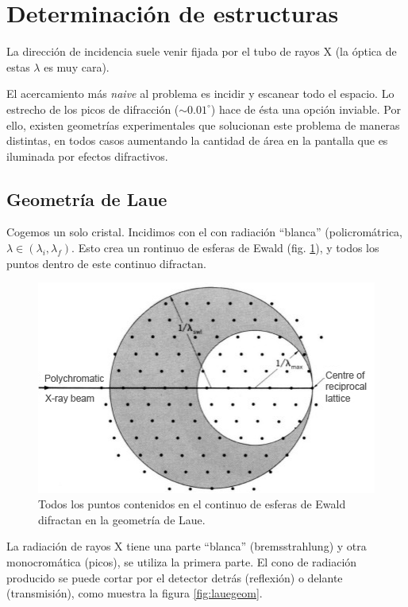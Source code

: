 \section{Determinación de estructuras}
La dirección de incidencia suele venir fijada por el tubo de rayos X (la óptica
de estas $\lambda$ es muy cara).

El acercamiento más \emph{naive} al problema es incidir y escanear todo el
espacio. Lo estrecho de los picos de difracción ($\sim 0.01^ \circ$) hace de ésta una opción inviable. Por ello, existen geometrías
experimentales que solucionan este problema de maneras distintas, en todos casos
aumentando la cantidad de área en la pantalla que es iluminada por efectos difractivos.

\subsection{Geometría de Laue}
Cogemos un solo cristal. Incidimos con el con radiación ``blanca''
(policromátrica, $\lambda \in (\lambda_i,\lambda_f)$. Esto crea un rontinuo de
esferas de Ewald (fig. \ref{fig:ewaldcontinuum}), y todos los puntos dentro de
este continuo difractan.
\begin{figure}
  \centering
  \includegraphics[width=\textwidth]{figures/ewaldcontinuum.png}
  \caption{Todos los puntos contenidos en el continuo de esferas de Ewald
    difractan en la geometría de Laue.}
  \label{fig:ewaldcontinuum}
\end{figure}
La radiación de rayos X tiene una parte ``blanca'' (bremsstrahlung) y otra monocromática (picos), se utiliza la primera parte. El cono de
radiación producido se puede cortar por el detector detrás (reflexión) o delante
(transmisión), como muestra la figura \ref{fig:lauegeom}.
